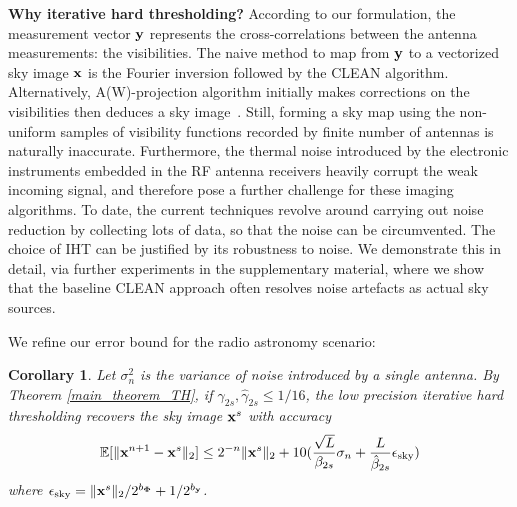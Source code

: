 \documentclass{article}
\newtheorem{corollary}{Corollary}
\begin{document}
{\bf Why iterative hard thresholding?} According to our formulation, the measurement vector ${\bf y}$ represents the cross-correlations between the antenna measurements: the visibilities. The naive method to map from ${\bf y}$ to a vectorized sky image ${\bf x}$ is the Fourier inversion followed by the {CLEAN} algorithm. Alternatively, {A(W)-projection} algorithm initially makes corrections on the visibilities then deduces a sky image~\cite{bhatganar2008ra}. Still, forming a sky map using the non-uniform samples of visibility functions recorded by finite number of antennas is naturally inaccurate. Furthermore, the thermal noise introduced by the electronic instruments embedded in the RF antenna receivers heavily corrupt the weak incoming signal, and therefore pose a further challenge for these imaging algorithms. To date, the current techniques revolve around carrying out noise reduction by collecting lots of data, so that the noise can be circumvented. The choice of IHT can be justified by its robustness to noise. We demonstrate this in detail, via further experiments in the supplementary material, where we show that the baseline {CLEAN} approach often resolves noise artefacts as actual sky sources. 

We refine our error bound for the radio astronomy scenario:

\begin{corollary}
Let $\sigma_n^2$ is the variance of noise introduced by a single antenna. By Theorem \ref{main_theorem_TH}, if ${\gamma}_{2s}, \hat{\gamma}_{2s}\leq 1/16$, the low precision iterative hard thresholding recovers the sky image ${\bf x}^s$ with accuracy
\begin{equation}
    \mathbb{E}[\|{\bf x}^{n+1} - {\bf x}^s \|_2] \leq 2^{-n}\| {\bf x}^s\|_2 + 10(\frac{\sqrt{L}}{\beta_{2s}}\sigma_n+\frac{L}{\hat{\beta}_{2s}}\epsilon_{\rm{sky}})
\end{equation}
where $\epsilon_{\rm{sky}} =  \|{\bf x}^s \|_2/2^{b_{\bf \Phi}} + 1/2^{b_{\bf y}}$.
\label{corollary1}
\end{corollary}


\end{document}

